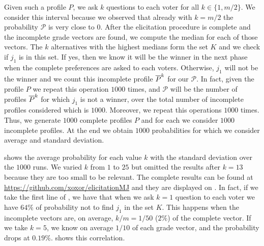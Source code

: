 	Given such a profile $P$, we ask $k$ questions to each voter for all $k\in \{1,m/2\}$. We consider this interval because we observed that already with $k=m/2$ the probability $\mathcal{P}$ is very close to $0$. After the elicitation procedure is complete and the incomplete grade vectors are found, we compute the median for each of those vectors. The $k$ alternatives with the highest medians form the set $K$ and we check if $j_1$ is in this set. If yes, then we know it will be the winner in the next phase when the complete preferences are asked to each voters. Otherwise, $j_1$ will not be the winner and we count this incomplete profile $\overline{P}^k$ for our $\mathcal{P}$. In fact, given the profile $P$ we repeat this operation $1000$ times, and $\mathcal{P}$ will be the number of profiles $\overline{P}^k$ for which $j_1$ is not a winner, over the total number of incomplete profiles considered which is $1000$. 
	Moreover, we repeat this operations $1000$ times. Thus, we generate $1000$ complete profiles $P$ and for each we consider $1000$ incomplete profiles. At the end we obtain $1000$ probabilities for which we consider average and standard deviation.
	
	 shows the average probability for each value $k$ with the standard deviation over the $1000$ runs. We varied $k$ from $1$ to $25$ but omitted the results after $k=13$ because they are too small to be relevant. The complete results can be found at \url{https://github.com/xoxor/elicitationMJ} and they are displayed on . 
	In fact, if we take the first line of , we have that when we ask $k=1$ question to each voter we have $64\%$ of probability not to find $j_1$ in the set $K$. This happens when the incomplete vectors are, on average, $k/m=1/50$ ($2\%$) of the complete vector. If we take $k=5$, we know on average $1/10$ of each grade vector, and the probability drops at $0.19\%$.  shows this correlation.
	
